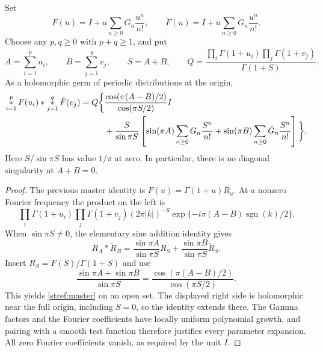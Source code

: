 \begin{theorem}\label{stref:generator}
Set
\[
 F(u)=I+u\sum_{n\ge0}G_n\frac{u^n}{n!},\qquad
 \check F(u)=I+u\sum_{n\ge0}\check G_n\frac{u^n}{n!}.
\]
Choose any $p,q\ge0$ with $p+q\ge1$, and put
\[
 A=\sum_{i=1}^p u_i,\qquad B=\sum_{j=1}^q v_j,\qquad S=A+B,
 \qquad Q=\frac{\prod_i\Gamma(1+u_i)\prod_j\Gamma(1+v_j)}{\Gamma(1+S)}.
\]
As a holomorphic germ of periodic distributions at the origin,
\begin{align}
 \mathop{*}_{i=1}^pF(u_i)*\mathop{*}_{j=1}^q\check F(v_j)
 =Q\bigg\{&\frac{\cos(\pi(A-B)/2)}{\cos(\pi S/2)}I\notag\\
 &+\frac{S}{\sin\pi S}\left[
   \sin(\pi A)\sum_{n\ge0}G_n\frac{S^n}{n!}
  +\sin(\pi B)\sum_{n\ge0}\check G_n\frac{S^n}{n!}
                  \right]\bigg\}.
 \label{stref:master}
\end{align}
Here $S/\sin\pi S$ has value $1/\pi$ at zero. In particular,
there is no diagonal singularity at $A+B=0$.
\end{theorem}
\begin{proof}
The previous master identity is $F(u)=\Gamma(1+u)R_u$.
At a nonzero Fourier frequency the product on the left is
\[
 \prod_i\Gamma(1+u_i)\prod_j\Gamma(1+v_j)
 (2\pi|k|)^{-S}
 \exp\{-i\pi(A-B)\operatorname{sgn}(k)/2\}.
\]
When $\sin\pi S\ne0$, the elementary sine addition identity gives
\[
 R_A*\check R_B
  =\frac{\sin\pi A}{\sin\pi S}R_S
   +\frac{\sin\pi B}{\sin\pi S}\check R_S.
\]
Insert $R_S=F(S)/\Gamma(1+S)$ and use
\[
 \frac{\sin\pi A+\sin\pi B}{\sin\pi S}
  =\frac{\cos(\pi(A-B)/2)}{\cos(\pi S/2)}.
\]
This yields \eqref{stref:master} on an open set. The displayed right
side is holomorphic near the full origin, including $S=0$, so the
identity extends there. The Gamma factors and the Fourier coefficients
have locally uniform polynomial growth, and pairing with a smooth test
function therefore justifies every parameter expansion. All zero
Fourier coefficients vanish, as required by the unit $I$.
\end{proof}


